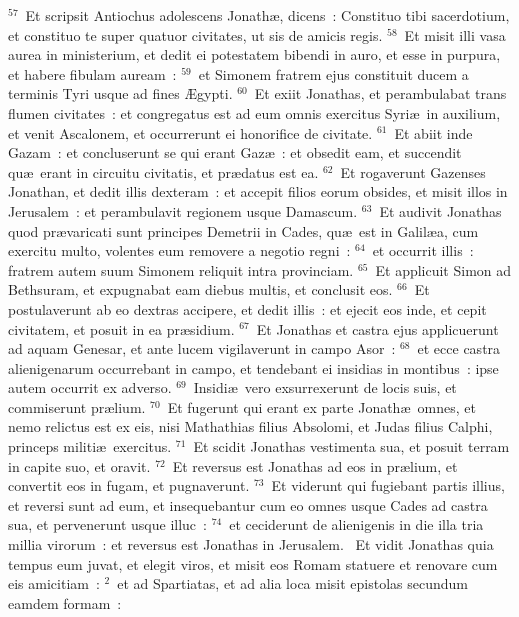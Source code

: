${}^{57}$~Et scripsit Antiochus adolescens Jonath\ae , dicens~: Constituo tibi sacerdotium, et constituo te super quatuor civitates, ut sis de amicis regis.
${}^{58}$~Et misit illi vasa aurea in ministerium, et dedit ei potestatem bibendi in auro, et esse in purpura, et habere fibulam auream~:
${}^{59}$~et Simonem fratrem ejus constituit ducem a terminis Tyri usque ad fines \AE gypti.
${}^{60}$~Et exiit Jonathas, et perambulabat trans flumen civitates~: et congregatus est ad eum omnis exercitus Syri\ae\ in auxilium, et venit Ascalonem, et occurrerunt ei honorifice de civitate.
${}^{61}$~Et abiit inde Gazam~: et concluserunt se qui erant Gaz\ae~: et obsedit eam, et succendit qu\ae\ erant in circuitu civitatis, et pr\ae datus est ea.
${}^{62}$~Et rogaverunt Gazenses Jonathan, et dedit illis dexteram~: et accepit filios eorum obsides, et misit illos in Jerusalem~: et perambulavit regionem usque Damascum.
${}^{63}$~Et audivit Jonathas quod pr\ae varicati sunt principes Demetrii in Cades, qu\ae\ est in Galil\ae a, cum exercitu multo, volentes eum removere a negotio regni~:
${}^{64}$~et occurrit illis~: fratrem autem suum Simonem reliquit intra provinciam.
${}^{65}$~Et applicuit Simon ad Bethsuram, et expugnabat eam diebus multis, et conclusit eos.
${}^{66}$~Et postulaverunt ab eo dextras accipere, et dedit illis~: et ejecit eos inde, et cepit civitatem, et posuit in ea pr\ae sidium.
${}^{67}$~Et Jonathas et castra ejus applicuerunt ad aquam Genesar, et ante lucem vigilaverunt in campo Asor~:
${}^{68}$~et ecce castra alienigenarum occurrebant in campo, et tendebant ei insidias in montibus~: ipse autem occurrit ex adverso.
${}^{69}$~Insidi\ae\ vero exsurrexerunt de locis suis, et commiserunt pr\ae lium.
${}^{70}$~Et fugerunt qui erant ex parte Jonath\ae\ omnes, et nemo relictus est ex eis, nisi Mathathias filius Absolomi, et Judas filius Calphi, princeps militi\ae\ exercitus.
${}^{71}$~Et scidit Jonathas vestimenta sua, et posuit terram in capite suo, et oravit.
${}^{72}$~Et reversus est Jonathas ad eos in pr\ae lium, et convertit eos in fugam, et pugnaverunt.
${}^{73}$~Et viderunt qui fugiebant partis illius, et reversi sunt ad eum, et insequebantur cum eo omnes usque Cades ad castra sua, et pervenerunt usque illuc~:
${}^{74}$~et ceciderunt de alienigenis in die illa tria millia virorum~: et reversus est Jonathas in Jerusalem.
~\lettrine[lines=10,image=true,loversize=0.05,lraise=-0.03]{E}{}t vidit Jonathas quia tempus eum juvat, et elegit viros, et misit eos Romam statuere et renovare cum eis amicitiam~:
${}^{2}$~et ad Spartiatas, et ad alia loca misit epistolas secundum eamdem formam~:
